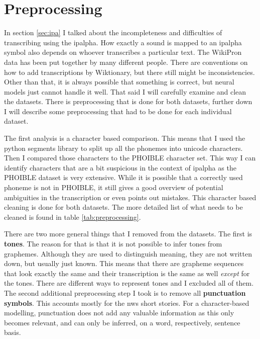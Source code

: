 \section{Preprocessing}
\label{preprocess}
In section \ref{sec:ipa} I talked about the incompleteness and difficulties of transcribing using the \ac{ipalpha}. How exactly a sound is mapped to an \ac{ipalpha} symbol also depends on whoever transcribes a particular text. The WikiPron data has been put together by many different people. There are conventions on how to add transcriptions by Wiktionary, but there still might be inconsistencies. Other than that, it is always possible that something is correct, but neural models just cannot handle it well. That said I will carefully examine and clean the datasets. There is preprocessing that is done for both datasets, further down I will describe some preprocessing that had to be done for each individual dataset.

The first analysis is a character based comparison. This means that I used the python segments library to split up all the phonemes into unicode characters. Then I compared those characters to the PHOIBLE character set. This way I can identify characters that are a bit suspicious in the context of \ac{ipalpha} as the PHOIBLE dataset is very extensive. While it is possible that a correctly used phoneme is not in PHOIBLE, it still gives a good overview of potential ambiguities in the transcription or even points out mistakes. This character based cleaning is done for both datasets. The more detailed list of what needs to be cleaned is found in table \ref{tab:preprocessing}.

There are two more general things that I removed from the datasets. The first is \textbf{tones}. The reason for that is that it is not possible to infer tones from graphemes. Although they are used to distinguish meaning, they are not written down, but usually just known. This means that there are grapheme sequences that look exactly the same and their transcription is the same as well \textit{except} for the tones. There are different ways to represent tones and I excluded all of them. The second additional preprocessing step I took is to remove all \textbf{punctuation symbols}. This accounts mostly for the \ac{nws} short stories. For a character-based modelling, punctuation does not add any valuable information as this only becomes relevant, and can only be inferred, on a word, respectively, sentence basis.    

